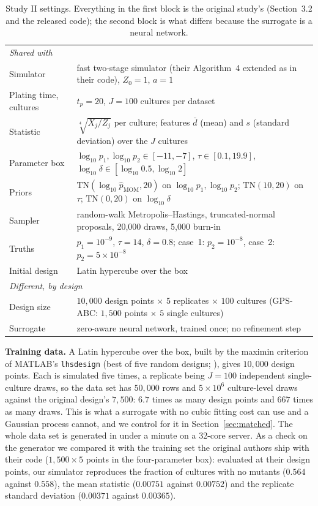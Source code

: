 \documentclass[sn-basic,iicol,pdflatex]{sn-jnl}
\begin{document}
\begin{table}[t]
\centering
\caption{Study II settings. Everything in the first block is the original study's
(Section~3.2 and the released code); the second block is what differs because
the surrogate is a neural network.}
\label{tab:settings}
\small
\begin{tabular}{ll}
\toprule
\multicolumn{2}{l}{\textit{Shared with \citet{lu2023}}} \\
Simulator & fast two-stage simulator (their Algorithm~4 extended as in their code), $Z_0=1$, $a=1$ \\
Plating time, cultures & $t_p=20$, $J=100$ cultures per dataset \\
Statistic & $\sqrt[4]{X_j/Z_j}$ per culture; features $\bar d$ (mean) and $s$ (standard deviation) over the $J$ cultures \\
Parameter box & $\log_{10}p_{1},\log_{10}p_{2}\in[-11,-7]$, $\tau\in[0.1,19.9]$, $\log_{10}\delta\in[\log_{10}0.5,\log_{10}2]$ \\
Priors & $\mathrm{TN}(\log_{10}\hat p_{\mathrm{MOM}},20)$ on $\log_{10}p_1,\log_{10}p_2$; $\mathrm{TN}(10,20)$ on $\tau$; $\mathrm{TN}(0,20)$ on $\log_{10}\delta$ \\
Sampler & random-walk Metropolis--Hastings, truncated-normal proposals, 20{,}000 draws, 5{,}000 burn-in \\
Truths & $p_1=10^{-9}$, $\tau=14$, $\delta=0.8$; case~1: $p_2=10^{-8}$, case~2: $p_2=5\times10^{-8}$ \\
Initial design & Latin hypercube over the box \\
\midrule
\multicolumn{2}{l}{\textit{Different, by design}} \\
Design size & $10{,}000$ design points $\times$ $5$ replicates $\times$ $100$ cultures (GPS-ABC: $1{,}500$ points $\times$ $5$ single cultures) \\
Surrogate & zero-aware neural network, trained once; no refinement step \\
\bottomrule
\end{tabular}
\end{table}

\noindent\textbf{Training data.} A Latin hypercube over the box, built by the
maximin criterion of MATLAB's \texttt{lhsdesign} (best of five random designs; \citealp{mckay1979}), gives
$10{,}000$ design points. Each is simulated five times, a replicate being $J=100$
independent single-culture draws, so the data set has $50{,}000$ rows and $5\times10^{6}$
culture-level draws against the original design's $7{,}500$: $6.7$ times as many
design points and $667$ times as many draws. This is what a surrogate with no
cubic fitting cost can use and a Gaussian process cannot, and we control for it
in Section~\ref{sec:matched}. The whole data set is generated in under a minute on
a 32-core server. As a check on the generator
we compared it with the training set the original authors ship with their code
($1{,}500\times5$ points in the four-parameter box): evaluated at their design
points, our simulator reproduces the fraction of cultures with no mutants
($0.564$ against $0.558$), the mean statistic ($0.00751$ against $0.00752$) and
the replicate standard deviation ($0.00371$ against $0.00365$).
\end{document}
